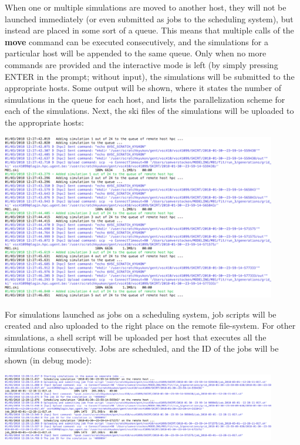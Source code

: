 \documentclass[15pt,a4paper,oneside,openright]{report}
\begin{document}
When one or multiple simulations are moved to another host, they will not be launched immediately (or even submitted as jobs to the scheduling system), but instead are placed in some sort of a queue. This means that multiple calls of the \textbf{move} command can be executed consecutively, and the simulations for a particular host will be appended to the same queue. Only when no more commands are provided and the interactive mode is left (by simply pressing ENTER in the prompt; without input), the simulations will be submitted to the appropriate hosts. Some output will be shown, where it states the number of simulations in the queue for each host, and lists the parallelization scheme for each of the simulations. Next, the ski files of the simulations will be uploaded to the appropriate hosts:

\begin{center}
\includegraphics[width=0.9\textwidth]{figures/move_upload_ski.png}
\end{center}

For simulations launched as jobs on a scheduling system, job scripts will be created and also uploaded to the right place on the remote file-system. For other simulations, a shell script will be uploaded per host that executes all the simulations consecutively. Jobs are scheduled, and the ID of the jobs will be shown (in debug mode):

\begin{center}
\includegraphics[width=0.9\textwidth]{figures/move_jobs.png}
\end{center}
\end{document}
